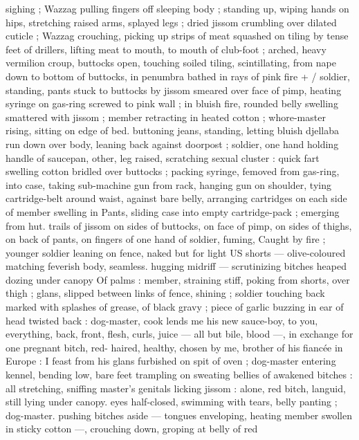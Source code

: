 sighing ; Wazzag pulling fingers off sleeping body ; standing up, 
wiping hands on hips, stretching raised arms, splayed legs ; dried 
jissom crumbling over dilated cuticle ; Wazzag crouching, picking up 
strips of meat squashed on tiling by tense feet of drillers, lifting 
meat to mouth, to mouth of club-foot ; arched, heavy vermilion 
croup, buttocks open, touching soiled tiling, scintillating, from nape 
down to bottom of buttocks, in penumbra bathed in rays of pink fire 
+ {\slash} soldier, standing, pants stuck to buttocks by jissom smeared over 
face of pimp, heating syringe on gas-ring screwed to pink wall ; in 
bluish fire, rounded belly swelling smattered with jissom ; member 
retracting in heated cotton ; whore-master rising, sitting on edge of 
bed. buttoning jeans, standing, letting bluish djellaba run down over 
body, leaning back against doorpost ; soldier, one hand holding 
handle of saucepan, other, leg raised, scratching sexual cluster : 
quick fart swelling cotton bridled over buttocks ; packing syringe, 
femoved from gas-ring, into case, taking sub-machine gun from rack, 
hanging gun on shoulder, tying cartridge-belt around waist, against 
bare belly, arranging cartridges on each side of member swelling in 
Pants, sliding case into empty cartridge-pack ; emerging from hut. 
trails of jissom on sides of buttocks, on face of pimp, on sides of 
thighs, on back of pants, on fingers of one hand of soldier, fuming, 
Caught by fire ; younger soldier leaning on fence, naked but for light 
US shorts --- olive-coloured matching feverish body, seamless. 
hugging midriff --- scrutinizing bitches heaped dozing under canopy 
Of palms : member, straining stiff, poking from shorts, over thigh ; 
glans, slipped between links of fence, shining ; soldier touching back 
marked with splashes of grease, of black gravy ; piece of garlic 
buzzing in ear of head twisted back : {\gl}{\td} dog-master, cook lends me 
his new sauce-boy, to you, everything, back, front, flesh, curls, juice 
--- all but bile, blood ---, in exchange for one pregnant bitch, red- 
haired, healthy, chosen by me, brother of his fiancée in Europe : I 
feast from his glans furbished on spit of oven{\thd} {\gr} ; dog-master 
entering kennel, bending low, bare feet trampling on sweating bellies 
of awakened bitches : all stretching, sniffing master's genitals 
licking jissom : alone, red bitch, languid, still lying under canopy. 
eyes half-closed, swimming with tears, belly panting ; dog-master. 
pushing bitches aside --- tongues enveloping, heating member 
swollen in sticky cotton ---, crouching down, groping at belly of red 

